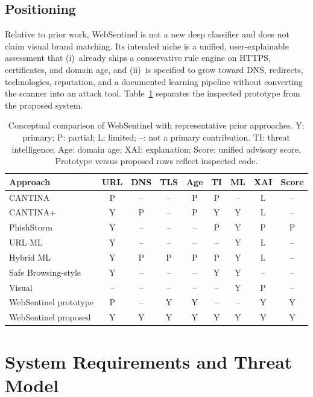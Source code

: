 \documentclass[conference]{IEEEtran}
\begin{document}
\subsection{Positioning}
Relative to prior work, WebSentinel is not a new deep classifier and does not claim visual brand matching. Its intended niche is a unified, user-explainable assessment that (i)~already ships a conservative rule engine on HTTPS, certificates, and domain age, and (ii)~is specified to grow toward DNS, redirects, technologies, reputation, and a documented learning pipeline without converting the scanner into an attack tool. Table~\ref{tab:comparison} separates the inspected prototype from the proposed system.

\begin{table}[!t]
\centering
\caption{Conceptual comparison of WebSentinel with representative prior approaches. Y: primary; P: partial; L: limited; --: not a primary contribution. TI: threat intelligence; Age: domain age; XAI: explanation; Score: unified advisory score. Prototype versus proposed rows reflect inspected code.}
\label{tab:comparison}
\renewcommand{\arraystretch}{1.12}
\begin{tabular}{>{\raggedright\arraybackslash}p{2.55cm}cccccccc}
\toprule
Approach & URL & DNS & TLS & Age & TI & ML & XAI & Score \\
\midrule
CANTINA~\cite{zhang2007cantina} & P & -- & -- & P & P & -- & L & -- \\
CANTINA+~\cite{xiang2011cantinaplus} & Y & P & -- & P & Y & Y & L & -- \\
PhishStorm~\cite{marchal2014phishstorm} & Y & -- & -- & -- & P & Y & P & P \\
URL ML~\cite{sahingoz2019ml} & Y & -- & -- & -- & -- & Y & L & -- \\
Hybrid ML~\cite{rao2019detection} & Y & P & P & P & P & Y & L & -- \\
Safe Browsing-style~\cite{whittaker2010large} & Y & -- & -- & -- & Y & Y & -- & -- \\
Visual~\cite{lin2021phishpedia} & -- & -- & -- & -- & -- & Y & P & -- \\
WebSentinel prototype & P & -- & Y & Y & -- & -- & Y & Y \\
WebSentinel proposed & Y & Y & Y & Y & Y & Y & Y & Y \\
\bottomrule
\end{tabular}
\end{table}

\section{System Requirements and Threat Model}
\label{sec:threat}
\end{document}
